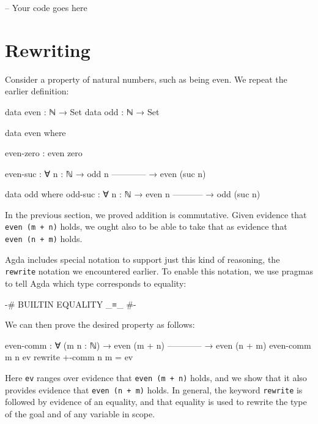 \begin{fence}
\begin{code}
-- Your code goes here
\end{code}
\end{fence}

\hypertarget{rewriting}{%
\section{Rewriting}\label{rewriting}}

Consider a property of natural numbers, such as being even. We repeat
the earlier definition:

\begin{fence}
\begin{code}
data even : ℕ → Set
data odd  : ℕ → Set

data even where

  even-zero : even zero

  even-suc : ∀ {n : ℕ}
    → odd n
      ------------
    → even (suc n)

data odd where
  odd-suc : ∀ {n : ℕ}
    → even n
      -----------
    → odd (suc n)
\end{code}
\end{fence}

In the previous section, we proved addition is commutative. Given
evidence that \texttt{even\ (m\ +\ n)} holds, we ought also to be able
to take that as evidence that \texttt{even\ (n\ +\ m)} holds.

Agda includes special notation to support just this kind of reasoning,
the \texttt{rewrite} notation we encountered earlier. To enable this
notation, we use pragmas to tell Agda which type corresponds to
equality:

\begin{fence}
\begin{code}
{-# BUILTIN EQUALITY _≡_ #-}
\end{code}
\end{fence}

We can then prove the desired property as follows:

\begin{fence}
\begin{code}
even-comm : ∀ (m n : ℕ)
  → even (m + n)
    ------------
  → even (n + m)
even-comm m n ev  rewrite +-comm n m  =  ev
\end{code}
\end{fence}

Here \texttt{ev} ranges over evidence that \texttt{even\ (m\ +\ n)}
holds, and we show that it also provides evidence that
\texttt{even\ (n\ +\ m)} holds. In general, the keyword \texttt{rewrite}
is followed by evidence of an equality, and that equality is used to
rewrite the type of the goal and of any variable in scope.

